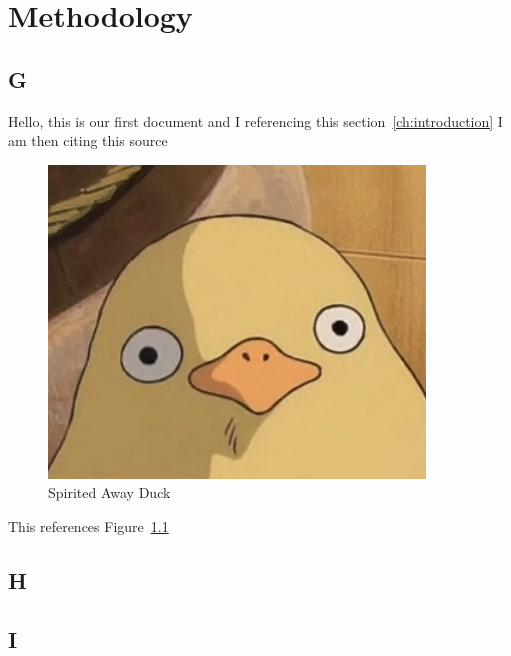 \chapter{Methodology}\label{ch:methodology}

\section{G}\label{sec:G}
Hello, this is our first document and I referencing this section~\ref{ch:introduction}
I am then citing this source~\cite{ani2019victory}


\begin{figure}
    \centering
    \includegraphics[width=10cm]{figures/SpiritedAwayDuck3}
    \caption{Spirited Away Duck}
    \label{fig:SpiritedAwayDuck}
\end{figure}


    This references Figure~\ref{fig:SpiritedAwayDuck}

\section{H}\label{sec:H}


\section{I}\label{sec:I}
